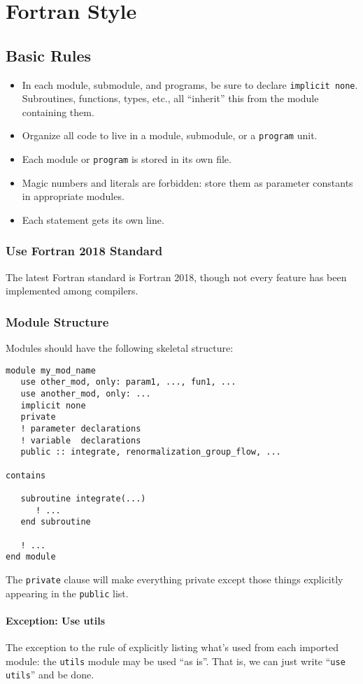 \chapter{Fortran Style}

\section{Basic Rules}
\begin{itemize}
\item In each module, submodule, and programs, be sure to declare
  \verb|implicit none|. Subroutines, functions, types, etc., all
  ``inherit'' this from the module containing them.
\item Organize all code to live in a module, submodule, or a
  \verb|program| unit.
\item Each module or \verb|program| is stored in its own file.
\item Magic numbers and literals are forbidden: store them as parameter
  constants in appropriate modules.
\item Each statement gets its own line.
\end{itemize}

\subsection{Use Fortran 2018 Standard}
The latest Fortran standard is Fortran 2018, though not every feature
has been implemented among compilers.

\subsection{Module Structure}
Modules should have the following skeletal structure:
\begin{verbatim}
module my_mod_name
   use other_mod, only: param1, ..., fun1, ...
   use another_mod, only: ...
   implicit none
   private
   ! parameter declarations
   ! variable  declarations
   public :: integrate, renormalization_group_flow, ...

contains

   subroutine integrate(...)
      ! ...
   end subroutine

   ! ...
end module
\end{verbatim}
The \verb|private| clause will make everything private except those
things explicitly appearing in the \verb|public| list.

\subsubsection{Exception: Use utils}
The exception to the rule of explicitly listing what's used from each
imported module: the {\tt utils} module may be used ``as is''. That is,
we can just write ``{\tt use utils}'' and be done.

